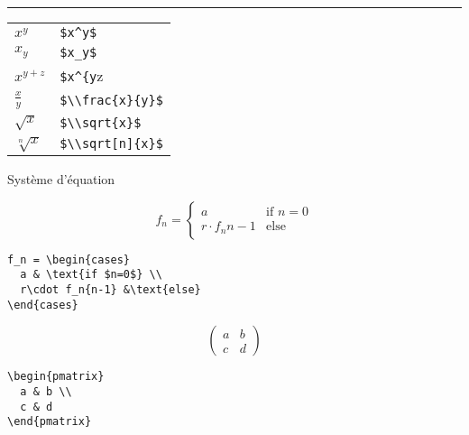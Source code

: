 \documentclass{article}
\let\code\lstinline
\begin{document}
\begin{multicols*}{3}
\begin{lstlisting}
\end{lstlisting}
\hrule
\begin{tabularx}{\columnwidth}{lX}
  $x^y$ &  \code+$x^y$+ \\
  $x_y$ &  \code+$x_y$+ \\
  $x^{y+z}$ &  \code+$x^{y+z}$+ \\
  $\frac{x}{y}$ & \code+$\\frac{x}{y}$+ \\
  $\sqrt{x}$ & \code+$\\sqrt{x}$+ \\
  $\sqrt[n]{x}$ & \code+$\\sqrt[n]{x}$+ \\
\end{tabularx}

Système d'équation

\begin{multicols*}{2}
\[
  f_n = \begin{cases}
    a & \text{if $n=0$} \\
    r\cdot f_n{n-1} &\text{else}
  \end{cases}
\]
\columnbreak
\begin{verbatim}
f_n = \begin{cases}
  a & \text{if $n=0$} \\
  r\cdot f_n{n-1} &\text{else}
\end{cases}
\end{verbatim}
\end{multicols*}

\begin{multicols*}{2}
  \[
    \begin{pmatrix}
      a & b \\
      c & d
    \end{pmatrix}
  \]
  \columnbreak
  \begin{verbatim}
\begin{pmatrix}
  a & b \\
  c & d
\end{pmatrix}
  \end{verbatim}
  \end{multicols*}


\end{multicols*}
\end{document}
